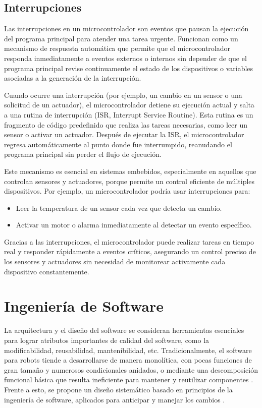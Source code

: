 \subsection{Interrupciones}
Las interrupciones en un microcontrolador son eventos que pausan la ejecución del programa principal para atender una tarea urgente. Funcionan como un mecanismo de respuesta automática que permite que el microcontrolador responda inmediatamente a eventos externos o internos sin depender de que el programa principal revise continuamente el estado de los dispositivos o variables asociadas a la generación de la interrupción.

Cuando ocurre una interrupción (por ejemplo, un cambio en un sensor o una solicitud de un actuador), el microcontrolador detiene su ejecución actual y salta a una rutina de interrupción (ISR, Interrupt Service Routine). Esta rutina es un fragmento de código predefinido que realiza las tareas necesarias, como leer un sensor o activar un actuador. Después de ejecutar la ISR, el microcontrolador regresa automáticamente al punto donde fue interrumpido, reanudando el programa principal sin perder el flujo de ejecución.

Este mecanismo es esencial en sistemas embebidos, especialmente en aquellos que controlan sensores y actuadores, porque permite un control eficiente de múltiples dispositivos. Por ejemplo, un microcontrolador podría usar interrupciones para:

\begin{itemize}
    \item Leer la temperatura de un sensor cada vez que detecta un cambio.
    \item Activar un motor o alarma inmediatamente al detectar un evento específico.
\end{itemize}

Gracias a las interrupciones, el microcontrolador puede realizar tareas en tiempo real y responder rápidamente a eventos críticos, asegurando un control preciso de los sensores y actuadores sin necesidad de monitorear activamente cada dispositivo constantemente.


\section{Ingeniería de Software}
\label{ingso}

La arquitectura y el diseño del software se consideran herramientas esenciales para lograr atributos importantes de calidad del software, como la modificabilidad, reusabilidad, mantenibilidad, etc.\cite{ShawGarlan1996, ghezzi2003, bass2003, DBLP:books/daglib/0030743}
Tradicionalmente, el software para robots tiende a desarrollarse de manera monolítica, con pocas funciones de gran tamaño y numerosos condicionales anidados, o mediante una descomposición funcional básica que resulta ineficiente para mantener y reutilizar componentes \cite{code-1,code-2}. Frente a esto, se propone un diseño sistemático basado en principios de la ingeniería de software, aplicados para anticipar y manejar los cambios \cite{Gamma:1995:DPE:186897, DBLP:books/lib/BuschmannHS07}.

